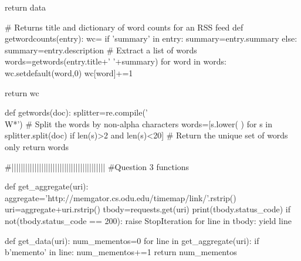 \documentclass[12pt, letterpaper]{article}
\begin{document}
\begin{MyPython}[caption={ten\textunderscore dimension.py}, label=lst:tendimension]
    return data
    

# Returns title and dictionary of word counts for an RSS feed
def getwordcounts(entry):
    wc={}
    if 'summary' in entry:
        summary=entry.summary
    else:
        summary=entry.description
    # Extract a list of words
    words=getwords(entry.title+' '+summary)
    for word in words:
        wc.setdefault(word,0)
        wc[word]+=1
   
    return wc

def getwords(doc):
    splitter=re.compile('\\W*')
    # Split the words by non-alpha characters
    words=[s.lower( ) for s in splitter.split(doc) if len(s)>2 and len(s)<20]
    # Return the unique set of words only
    return words

#|||||||||||||||||||||||||||||||||||||||||
#Question 3 functions

def get_aggregate(uri):
    aggregate='http://memgator.cs.odu.edu/timemap/link/'.rstrip()
    uri=aggregate+uri.rstrip()
    tbody=requests.get(uri)
    print(tbody.status_code)
    if not(tbody.status_code == 200):
        raise StopIteration
    for line in tbody:
        yield line
                
def get_data(uri):
    num_mementos=0
    for line in get_aggregate(uri):
        if b'memento' in line:
            num_mementos+=1
    return num_mementos
\end{MyPython}
\end{document}
